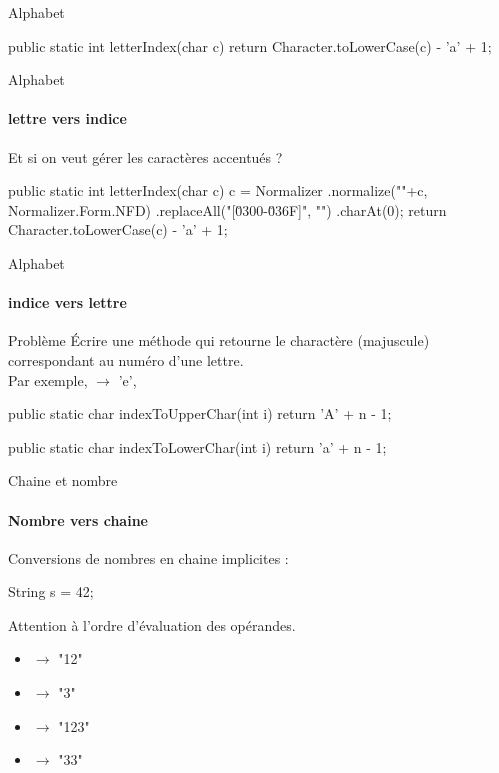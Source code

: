 \begin{hideedit}
\begin{frame}[fragile]{Alphabet}
  \pause
  \begin{java}
public static int letterIndex(char c) {
    return Character.toLowerCase(c) - 'a' + 1;
}
  \end{java}
\end{frame}

\begin{frame}[fragile]{Alphabet}
  \framesubtitle{lettre vers indice}
  Et si on veut gérer les caractères accentués ?
  \pause
  \begin{java}
public static int letterIndex(char c){
    c = Normalizer
            .normalize(""+c, Normalizer.Form.NFD)
            .replaceAll("[\u0300-\u036F]", "")
            .charAt(0);
    return Character.toLowerCase(c) - 'a' + 1;
}
  \end{java}
\end{frame}

\begin{frame}[fragile]{Alphabet}
  \framesubtitle{indice vers lettre}
  \begin{block}{Problème}
    Écrire une méthode  qui retourne le charactère
    (majuscule) correspondant au numéro d'une lettre.\\
    Par exemple,  \(\rightarrow\) 'e',
  \end{block}
  \pause
  \begin{java}
public static char indexToUpperChar(int i) {
    return 'A' + n - 1;
}
  \end{java}
  \begin{java}
public static char indexToLowerChar(int i) {
    return 'a' + n - 1;
}
  \end{java}
\end{frame}

\begin{frame}[fragile]{Chaine et nombre}
  \framesubtitle{Nombre vers chaine}
  Conversions de nombres en chaine implicites :
  \begin{java}
String s = 42;
  \end{java}

  \pause Attention à l'ordre d'évaluation des opérandes.
  \begin{itemize}
    \item {} \pause \(\rightarrow\) "12"
    \pause
    \item {} \pause \(\rightarrow\) "3"
    \pause
    \item {} \pause\(\rightarrow\) "123"
    \pause
    \item {} \pause \(\rightarrow\) "33"
  \end{itemize}
\end{frame}


\end{hideedit}

